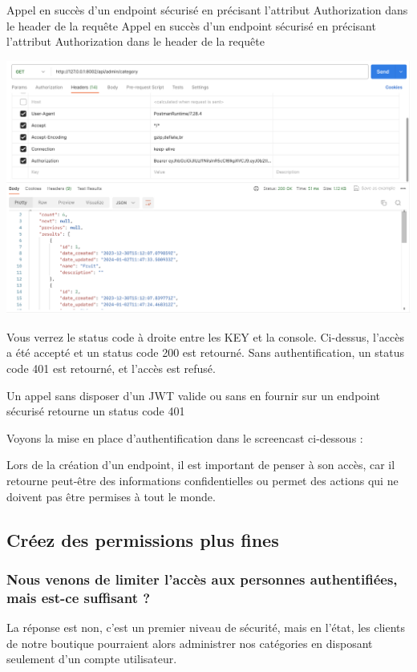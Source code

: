 Appel en succès d’un endpoint sécurisé en précisant l’attribut Authorization dans le header de la requête
Appel en succès d’un endpoint sécurisé en précisant l’attribut Authorization dans le header de la requête
\begin{center}
\includegraphics[width=15cm]{images/image25.png}
\end{center}

Vous verrez le status code à droite entre les KEY et la console. Ci-dessus, l'accès a été accepté et un status code 200 est retourné. Sans authentification, un status code 401 est retourné, et l’accès est {\color{monOrange}refusé}.

Un appel sans disposer d’un JWT valide ou sans en fournir sur un endpoint sécurisé retourne un status code 401


Voyons la mise en place d'authentification dans le screencast ci-dessous :

\begin{theorem}
Lors de la création d’un endpoint, il est important de penser à son accès, car il retourne peut-être des informations {\color{monOrange}confidentielles} ou permet des {\color{monOrange}actions} qui ne doivent pas être permises à tout le monde.
\end{theorem}

\subsection{Créez des permissions plus fines}
\subsubsection*{Nous venons de limiter l’accès aux personnes authentifiées, mais est-ce suffisant ?}
La réponse est non, c’est un {\color{monOrange}premier niveau de sécurité}, mais en l’état, les clients de notre boutique pourraient alors administrer nos catégories en disposant seulement d’un compte utilisateur.

